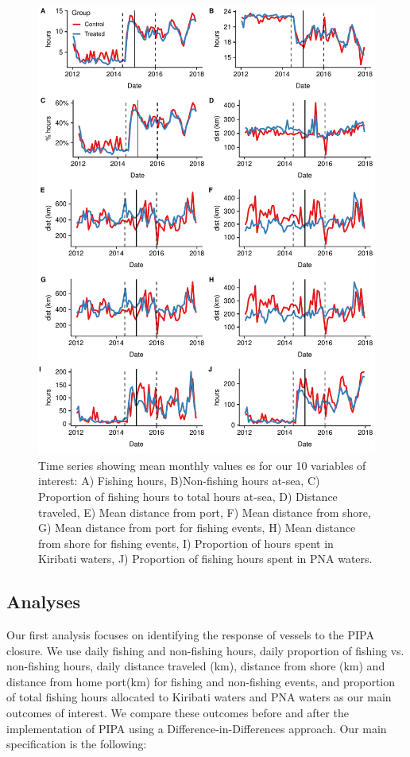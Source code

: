 \documentclass[9p,twocolumn,twoside,lineno]{pnas-new}
\begin{document}
\begin{figure}
\centering
\includegraphics{img/all_panels.pdf}
\caption{\label{fig:all_panels}Time series showing mean monthly values es for our 10 variables of interest:
A) Fishing hours, B)Non-fishing hours at-sea,
C) Proportion of fishing hours to total hours at-sea,
D) Distance traveled, E) Mean distance from port,
F) Mean distance from shore,
G) Mean distance from port for fishing events,
H) Mean distance from shore for fishing events,
I) Proportion of hours spent in Kiribati waters,
J) Proportion of fishing hours spent in PNA waters.}
\end{figure}

\clearpage

\subsection{Analyses}\label{analyses}

Our first analysis focuses on identifying the response of 
vessels to the PIPA closure. We use daily fishing and non-fishing hours,
daily proportion of fishing vs. non-fishing hours, daily distance traveled (km), 
distance from shore (km) and distance from home port(km) for fishing and non-fishing events,
and proportion of total fishing hours allocated to Kiribati waters and PNA waters
as our main outcomes of interest.
We compare these outcomes before and after the implementation
of PIPA using a Difference-in-Differences approach. Our main
specification is the following:
\end{document}
